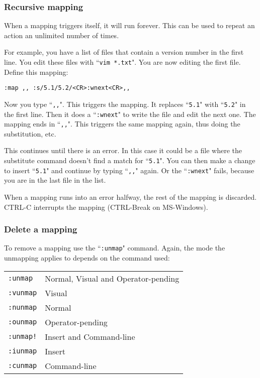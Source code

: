 \subsubsection{Recursive mapping}
When a mapping triggers itself, it will run forever.
This can be used to repeat an action an unlimited number of times.

For example, you have a list of files that contain a version number in the first line.
You edit these files with ``\texttt{vim *.txt}".
You are now editing the first file.
Define this mapping:

\begin{Verbatim}[samepage=true]
 :map ,, :s/5.1/5.2/<CR>:wnext<CR>,,
\end{Verbatim}

Now you type ``\texttt{,,}".
This triggers the mapping.
It replaces ``\texttt{5.1}" with ``\texttt{5.2}" in the first line.
Then it does a ``\texttt{:wnext}" to write the file and edit the next one.
The mapping ends in ``\texttt{,,}".
This triggers the same mapping again, thus doing the substitution, etc.

This continues until there is an error.
In this case it could be a file where the substitute command doesn't find a match for ``\texttt{5.1}".
You can then make a change to insert ``\texttt{5.1}" and continue by typing ``\texttt{,,}" again.
Or the ``\texttt{:wnext}" fails, because you are in the last file in the list.

When a mapping runs into an error halfway, the rest of the mapping is discarded.
CTRL-C interrupts the mapping (CTRL-Break on MS-Windows).
\subsubsection{Delete a mapping}
To remove a mapping use the ``\texttt{:unmap}" command.
Again, the mode the unmapping applies to depends on the command used:

\begin{center} \begin{tabular}{l l}
				\texttt{:unmap} & Normal, Visual and Operator-pending \\
				\texttt{:vunmap} & Visual \\
				\texttt{:nunmap} & Normal \\
				\texttt{:ounmap} & Operator-pending \\
				\texttt{:unmap!} & Insert and Command-line \\
				\texttt{:iunmap} & Insert \\
				\texttt{:cunmap} & Command-line \\
\end{tabular} \end{center}

